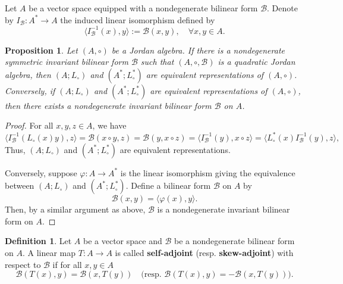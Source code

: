 \documentclass[12pt, reqno, a4paper]{amsart}
\newtheorem{proposition}[theorem]{Proposition}
\theoremstyle{definition}
\newtheorem{definition}[theorem]{Definition}
\begin{document}
Let $A$ be a vector space equipped with a nondegenerate bilinear form $\mathcal{B}$.
Denote by $I_{\mathcal{B}}: A^* \to A$ the induced linear isomorphism defined by
\begin{equation*}
	\langle I_{\mathcal{B}}^{-1}(x), y\rangle := \mathcal{B}(x, y), \quad \forall x,y \in A.
\end{equation*}


\begin{proposition}\label{dualdj:x}
	Let $(A, \circ)$ be a Jordan algebra.
	If there is a nondegenerate symmetric invariant bilinear form $\mathcal{B}$ such that $(A, \circ,\mathcal{B})$ is a quadratic Jordan algebra, then $(A; L_{\circ})$ and $(A^*; L_{\circ}^*)$ are equivalent representations of $(A, \circ)$. Conversely, if $(A; L_{\circ})$ and $(A^*; L_{\circ}^*)$ are equivalent representations of $(A, \circ)$, then there exists a nondegenerate invariant bilinear form $\mathcal{B}$ on $A$.
\end{proposition}
\begin{proof}
	For all $x, y, z \in A$, we have
	\begin{equation*}
		\langle I_\mathcal{B}^{-1}(L_{\circ}(x)y) , z\rangle = \mathcal{B}(x \circ y, z) = \mathcal{B}(y,x \circ z) = \langle I_\mathcal{B}^{-1}(y), x \circ z \rangle = \langle L^*_{\circ}(x)I_\mathcal{B}^{-1}(y), z\rangle,
	\end{equation*}
	Thus, $(A; L_{\circ})$ and $(A^*; L_{\circ}^*)$ are equivalent representations.
	
	Conversely, suppose $\varphi: A \to A^*$ is the linear isomorphism giving the equivalence between $(A; L_{\circ})$ and $(A^*; L_{\circ}^*)$.
	Define a bilinear form $\mathcal{B}$ on $A$ by
	\begin{equation*}
		\mathcal{B}(x, y) = \langle \varphi(x), y\rangle.
	\end{equation*}
	Then, by a similar argument as above, $\mathcal{B}$ is a nondegenerate invariant bilinear form on $A$.
\end{proof}



\begin{definition}
	Let $A$ be a vector space and $\mathcal{B}$ be a nondegenerate bilinear form on $A$.
	A linear map $T: A \to A$ is called \textbf{self-adjoint} (resp. \textbf{skew-adjoint}) with respect to $\mathcal{B}$ if for all $x, y \in A$
	\begin{equation*}
		\mathcal{B}(T(x), y) = \mathcal{B}(x, T(y)) \quad \text{(resp. $\mathcal{B}(T(x), y) = -\mathcal{B}(x, T(y))$)}.
	\end{equation*}
\end{definition}
\end{document}

